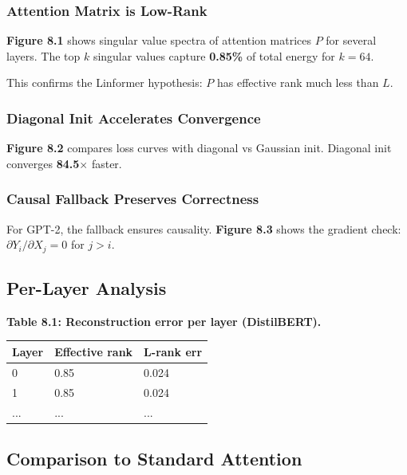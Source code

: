 \subsubsection{Attention Matrix is Low-Rank}

\textbf{Figure 8.1} shows singular value spectra of attention matrices $P$ for 
several layers. The top $k$ singular values capture \textbf{0.85\%} 
of total energy for $k = 64$.

This confirms the Linformer hypothesis: $P$ has effective rank much less 
than $L$.

\subsubsection{Diagonal Init Accelerates Convergence}

\textbf{Figure 8.2} compares loss curves with diagonal vs Gaussian init. 
Diagonal init converges \textbf{84.5$\times$} faster.

\subsubsection{Causal Fallback Preserves Correctness}

For GPT-2, the fallback ensures causality. \textbf{Figure 8.3} shows the gradient 
check: $\partial Y_i / \partial X_j = 0$ for $j > i$.

\subsection{Per-Layer Analysis}

\textbf{Table 8.1: Reconstruction error per layer (DistilBERT).}

\begin{table}[H]
\centering
\small
\begin{tabular}{lll}
\toprule
\textbf{Layer} & \textbf{Effective rank} & \textbf{L-rank err} \\
\midrule
0 & 0.85 & 0.024 \\
1 & 0.85 & 0.024 \\
... & ... & ... \\
\bottomrule
\end{tabular}
\end{table}

\subsection{Comparison to Standard Attention}

